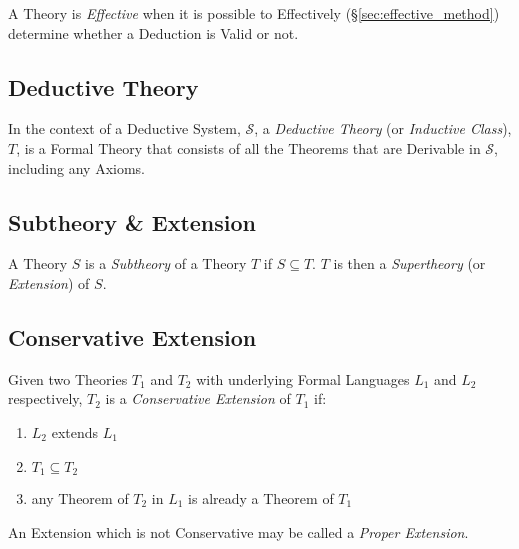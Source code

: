 A Theory is \emph{Effective} when it is possible to Effectively
(\S\ref{sec:effective_method}) determine whether a Deduction is Valid
or not.



\subsection{Deductive Theory}\label{sec:deductive_theory}

In the context of a Deductive System, $\mathcal{S}$, a \emph{Deductive
  Theory} (or \emph{Inductive Class}), $T$, is a Formal Theory that
consists of all the Theorems that are Derivable in $\mathcal{S}$,
including any Axioms.



\subsection{Subtheory \& Extension}\label{sec:subtheory}

A Theory $S$ is a \emph{Subtheory} of a Theory $T$ if $S \subseteq T$.
$T$ is then a \emph{Supertheory} (or \emph{Extension}) of $S$.



\subsection{Conservative Extension}\label{sec:conservative_extension}

Given two Theories $T_1$ and $T_2$ with underlying Formal Languages
$L_1$ and $L_2$ respectively, $T_2$ is a \emph{Conservative Extension}
of $T_1$ if:
\begin{enumerate}
    \item $L_2$ extends $L_1$
    \item $T_1 \subseteq T_2$
    \item any Theorem of $T_2$ in $L_1$ is already a Theorem of $T_1$
\end{enumerate}
An Extension which is not Conservative may be called a \emph{Proper
  Extension}.



